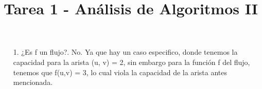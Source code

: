 \documentclass[12pt]{article}
\title{Tarea 1 - Análisis de Algoritmos II}
\begin{document}
\begin{itemize}
\item[1. ]¿Es f un flujo?. No. Ya que hay un caso especifico, donde tenemos la capacidad para la arista (u, v) = 2, sin embargo para la función f del flujo, tenemos que f(u,v) = 3, lo cual viola la capacidad de la arista antes mencionada.



\end{itemize}
\end{document}
